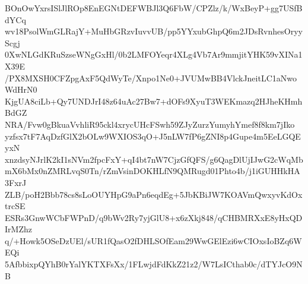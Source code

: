 BOnOwYxrsISlJlROp8EnEGNtDEFWBJl3Q6FbW/CPZlz/k/WxBeyP+gg7USfBdYCq
wv18PsolWmGLRajY+MuHbGRzvIuvvUB/pp5YYxubGhpQ6m2JDsRvnhesOryyScgj
0XwNLGdKRuSzseWNgGxHl/0b2LMFOYeqr4XLg4Vb7Ar9mmjitYHK59vXINa1X39E
/PX8MXSH0CFZpgAxF5QdWyTe/Xnpo1Ne0+JVUMwBB4VlckJneitLC1aNwoWdHrN0
KjgUA8ciLb+Qy7UNDJrI48z64uAc27Bw7+dOFs9XyuT3WEKmazq2HJheKHmhBdGZ
NRA/Fvw0gBkuaVvhliR95ckl4xrycUHcFSwh59ZJyZurzYumyhYmef8f8km7jIko
yzfsx7tF7AqDzfGlX2bOLw9WXIOS3qO+J5nLW7fP6gZNI8p4Gupe4m5EeLGQEyxN
xnzdsyNJrlK2kI1sNVm2fpcFxY+qI4bt7nW7CjzGfQFS/g6QagDlUjIJwG2cWqMb
mX6bMx0nZMRLvqS0Tn/rZmVsinDOKHLfN9QMRugd01Phto4b/j1iGUHHkHA3FxrJ
ZLB/poH2Bbb78cs8sLoOUYHpG9aPn6eqdEg+5JbKBiJW7KOAVmQwxyvKdOxtrcSE
ESRs3GnwWCbFWPnD/q9bWv2Ry7yjGlU8+x6zXkj848/qCHBMRXxE8yHxQDIrMZhz
q/+Howk5OSeDzUEl/sUR1fQasO2fDHLSOfEam29WwGElEzi6wCIOxsIoBZq6WEQi
5AfbbixpQYhB0rYalYKTXFsXx/1FLwjdFdKkZ21z2/W7LsICthab0c/dTYJcO9NB
